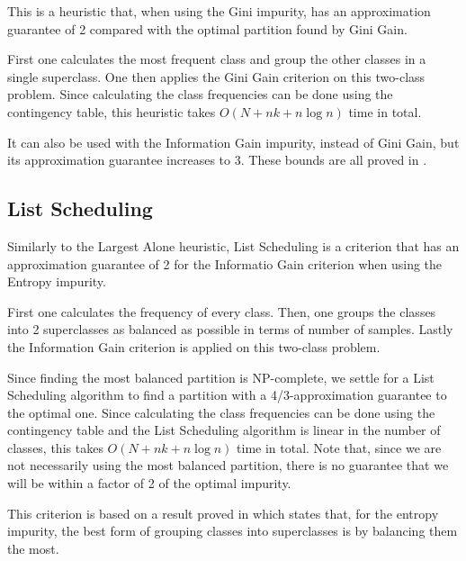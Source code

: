 This is a heuristic that, when using the Gini impurity, has an approximation guarantee of 2 compared with the optimal partition found by Gini Gain.

First one calculates the most frequent class and group the other classes in a single superclass. One then applies the Gini Gain criterion on this two-class problem. Since calculating the class frequencies can be done using the contingency table, this heuristic takes $O(N + n k + n \log n)$ time in total.

It can also be used with the Information Gain impurity, instead of Gini Gain, but its approximation guarantee increases to 3. These bounds are all proved in \cite{icml2018}.

\subsection{List Scheduling}

Similarly to the Largest Alone heuristic, List Scheduling is a criterion that has an approximation guarantee of 2 for the Informatio Gain criterion when using the Entropy impurity.

First one calculates the frequency of every class. Then, one groups the classes into 2 superclasses as balanced as possible in terms of number of samples. Lastly the Information Gain criterion is applied on this two-class problem.

Since finding the most balanced partition is NP-complete, we settle for a List Scheduling algorithm to find a partition with a 4/3-approximation guarantee to the optimal one. Since calculating the class frequencies can be done using the contingency table and the List Scheduling algorithm is linear in the number of classes, this takes $O(N + n k + n \log n)$ time in total. Note that, since we are not necessarily using the most balanced partition, there is no guarantee that we will be within a factor of 2 of the optimal impurity.

This criterion is based on a result proved in \cite{icml2018} which states that, for the entropy impurity, the best form of grouping classes into superclasses is by balancing them the most.
